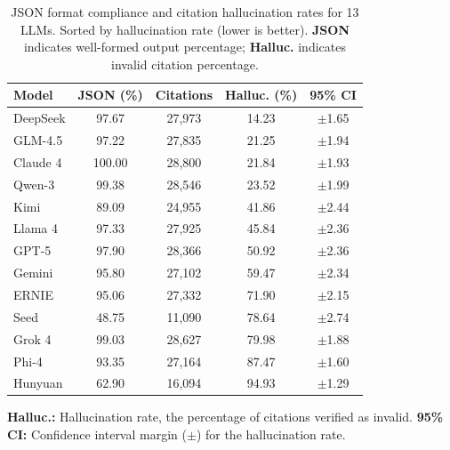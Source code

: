 \begin{table}[t]
  \centering
  \begin{threeparttable}
    \caption{JSON format compliance and citation hallucination rates for 13 LLMs. Sorted by hallucination rate (lower is better). \textbf{JSON} indicates well-formed output percentage; \textbf{Halluc.} indicates invalid citation percentage.}
    \label{tab:model_validity}
    \footnotesize
    \begin{tabular}{lcccc}
    \toprule
    \textbf{Model} & \cellcolor{blue!8}\textbf{JSON (\%)} & \cellcolor{green!12}\textbf{Citations} & \cellcolor{red!12}\textbf{Halluc. (\%)} & \textbf{95\% CI} \\
    \midrule
    DeepSeek & \cellcolor{blue!12}97.67 & \cellcolor{green!12}27,973 & \cellcolor{red!6}14.23 & $\pm$1.65 \\
    GLM-4.5 & \cellcolor{blue!12}97.22 & \cellcolor{green!12}27,835 & \cellcolor{red!6}21.25 & $\pm$1.94 \\
    Claude 4 & \cellcolor{blue!15}100.00 & \cellcolor{green!14}28,800 & \cellcolor{red!8}21.84 & $\pm$1.93 \\
    Qwen-3 & \cellcolor{blue!12}99.38 & \cellcolor{green!12}28,546 & \cellcolor{red!8}23.52 & $\pm$1.99 \\
    Kimi & \cellcolor{blue!6}89.09 & \cellcolor{green!10}24,955 & \cellcolor{red!12}41.86 & $\pm$2.44 \\
    Llama 4 & \cellcolor{blue!12}97.33 & \cellcolor{green!12}27,925 & \cellcolor{red!14}45.84 & $\pm$2.36 \\
    GPT-5 & \cellcolor{blue!12}97.90 & \cellcolor{green!12}28,366 & \cellcolor{red!16}50.92 & $\pm$2.36 \\
    Gemini & \cellcolor{blue!10}95.80 & \cellcolor{green!10}27,102 & \cellcolor{red!18}59.47 & $\pm$2.34 \\
    ERNIE & \cellcolor{blue!10}95.06 & \cellcolor{green!10}27,332 & \cellcolor{red!20}71.90 & $\pm$2.15 \\
    Seed & \cellcolor{blue!3}48.75 & \cellcolor{green!6}11,090 & \cellcolor{red!22}78.64 & $\pm$2.74 \\
    Grok 4 & \cellcolor{blue!12}99.03 & \cellcolor{green!12}28,627 & \cellcolor{red!24}79.98 & $\pm$1.88 \\
    Phi-4 & \cellcolor{blue!8}93.35 & \cellcolor{green!10}27,164 & \cellcolor{red!26}87.47 & $\pm$1.60 \\
    Hunyuan & \cellcolor{blue!3}62.90 & \cellcolor{green!8}16,094 & \cellcolor{red!28}94.93 & $\pm$1.29 \\
    \bottomrule
    \end{tabular}
    \begin{tablenotes}
      \footnotesize
      \item \colorbox{red!15}{\textbf{Halluc.:}} Hallucination rate, the percentage of citations verified as invalid. \textbf{95\% CI:} Confidence interval margin ($\pm$) for the hallucination rate.
    \end{tablenotes}
  \end{threeparttable}
\end{table}
